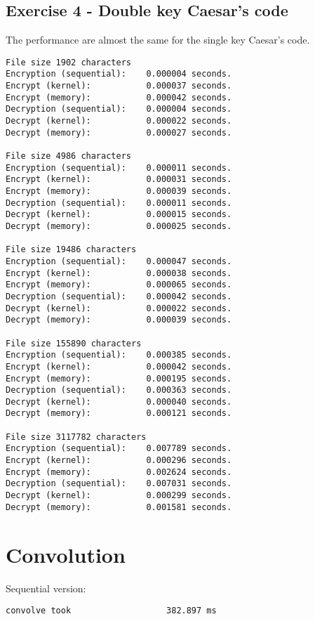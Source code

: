 \documentclass[a4paper]{article}
\begin{document}
\subsection{Exercise 4 - Double key Caesar's code}

The performance are almost the same for the single key Caesar's code.

\begin{verbatim}
File size 1902 characters
Encryption (sequential):    0.000004 seconds.
Encrypt (kernel):           0.000037 seconds.
Encrypt (memory):           0.000042 seconds.
Decryption (sequential):    0.000004 seconds.
Decrypt (kernel):           0.000022 seconds.
Decrypt (memory):           0.000027 seconds.

File size 4986 characters
Encryption (sequential):    0.000011 seconds.
Encrypt (kernel):           0.000031 seconds.
Encrypt (memory):           0.000039 seconds.
Decryption (sequential):    0.000011 seconds.
Decrypt (kernel):           0.000015 seconds.
Decrypt (memory):           0.000025 seconds.

File size 19486 characters
Encryption (sequential):    0.000047 seconds.
Encrypt (kernel):           0.000038 seconds.
Encrypt (memory):           0.000065 seconds.
Decryption (sequential):    0.000042 seconds.
Decrypt (kernel):           0.000022 seconds.
Decrypt (memory):           0.000039 seconds.

File size 155890 characters
Encryption (sequential):    0.000385 seconds.
Encrypt (kernel):           0.000042 seconds.
Encrypt (memory):           0.000195 seconds.
Decryption (sequential):    0.000363 seconds.
Decrypt (kernel):           0.000040 seconds.
Decrypt (memory):           0.000121 seconds.

File size 3117782 characters
Encryption (sequential):    0.007789 seconds.
Encrypt (kernel):           0.000296 seconds.
Encrypt (memory):           0.002624 seconds.
Decryption (sequential):    0.007031 seconds.
Decrypt (kernel):           0.000299 seconds.
Decrypt (memory):           0.001581 seconds.
\end{verbatim}

\section{Convolution}

Sequential version:

\begin{verbatim}
convolve took                   382.897 ms
\end{verbatim}
\end{document}
